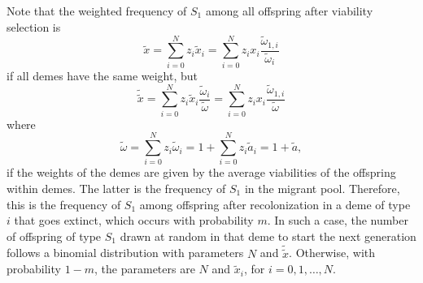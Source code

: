 \documentclass[11pt]{article}
\begin{document}
Note that the weighted frequency of $S_1$ among all offspring after viability selection is
\begin{equation}\label{sec1-eq12}
\tilde{x}=\sum_{i=0}^{N}z_i\tilde{x}_i=\sum_{i=0}^{N}z_ix_i\frac{\tilde{\omega}_{1,i}}{\tilde{\omega}_{i}}
\end{equation}
if all demes have the same weight, but 
\begin{equation}\label{sec1-eq15}
\tilde{\tilde{x}}=\sum_{i=0}^{N}z_i\tilde{x}_{i}\frac{\tilde{\omega}_{i}}{\tilde{\omega}}=\sum_{i=0}^{N}z_ix_i\frac{\tilde{\omega}_{1,i}}{\tilde{\omega}_{}}
\end{equation}
where
\begin{equation}\label{sec1-eq13}
\tilde{\omega}=\sum_{i=0}^{N}z_i\tilde{\omega}_{i}=1+\sum_{i=0}^{N}z_i\tilde{a}_{i}=1+\tilde{a},
\end{equation}
if the weights of the demes are given by the average viabilities of the offspring within demes. The latter is the frequency of $S_1$ in the migrant pool. Therefore, this is the frequency of $S_1$ among offspring after recolonization in a deme of type $i$ that goes extinct, which occurs with probability $m$. In such a case, the number of offspring of type $S_1$ drawn at random in that deme to start the next generation follows a binomial distribution with parameters $N$ and $\tilde{\tilde{x}}$. Otherwise, with probability $1-m$, the parameters are $N$ and $\tilde{x}_i$, for $i=0, 1, \ldots, N$.


\end{document}
